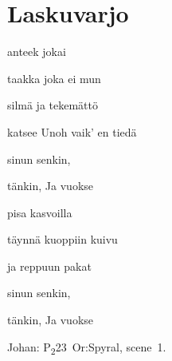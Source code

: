 \documentclass[12pt,a4paper]{article}
\begin{document}
\thispagestyle{empty}
\section*{Laskuvarjo}

\begin{SBVerse}
 anteek  jokai

 taakka  joka ei mun 

 silmä ja  tekemättö

 katsee Unoh vaik' en tiedä 
\end{SBVerse}

\begin{SBChorus}
 sinun   senkin, 

 tänkin,  Ja  
vuokse
\end{SBChorus}

\begin{SBVerse*}
      
\end{SBVerse*}

\begin{SBVerse}
  pisa kasvoilla 

 täynnä   kuoppiin kuivu

  ja  reppuun pakat
\end{SBVerse}

\begin{SBChorus}
 sinun   senkin, 

 tänkin,  Ja  
vuokse
\end{SBChorus}

{\SBLyricNoteFont Johan: P\textsubscript{2}23~Or:Spyral, scene~1.}
\end{document}
